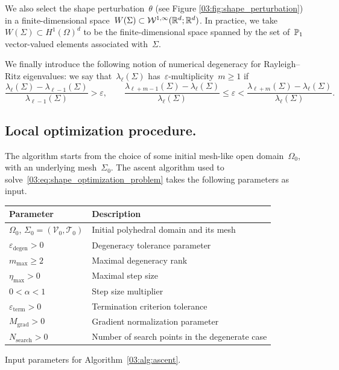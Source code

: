 We also select the shape perturbation~$\theta$ (see Figure \ref{03:fig:shape_perturbation}) in a finite-dimensional space~$W(\Sigma)\subset \Winf(\R^d;\R^d)$. In practice, we take~$W(\Sigma) \subset H^1(\Omega)^d$ to be the finite-dimensional space spanned by the set of~$\P_1$ vector-valued elements associated with~$\Sigma$.

We finally introduce the following notion of numerical degeneracy for Rayleigh--Ritz eigenvalues:
we say that~$\lambda_\ell(\Sigma)$ has~$\varepsilon$-multiplicity~$m \geq 1$ if
    \begin{equation}
        \label{03:eq:degeneracy}
        \frac{\lambda_{\ell}(\Sigma)-\lambda_{\ell-1}(\Sigma)}{\lambda_{\ell-1}(\Sigma)} > \varepsilon,\qquad \frac{\lambda_{\ell+m-1}(\Sigma)-\lambda_\ell(\Sigma)}{\lambda_\ell(\Sigma)} \leq \varepsilon < \frac{\lambda_{\ell+m}(\Sigma)-\lambda_\ell(\Sigma)}{\lambda_\ell(\Sigma)}.
    \end{equation}

\subsection{Local optimization procedure.}
\label{03:subsec:local_opt}
The algorithm starts from the choice of some initial mesh-like open domain~$\Omega_0$, with an underlying mesh~$\Sigma_0$.
The ascent algorithm used to solve~\eqref{03:eq:shape_optimization_problem} takes the following parameters as input.

\noindent
{
\begin{center}
\begin{tabular}{ll}
\toprule
\textbf{Parameter} & \textbf{Description} \\
\midrule
$\Omega_0$, $\Sigma_0 = (\mathcal{V}_0, \mathcal{T}_0)$ & Initial polyhedral domain and its mesh \\
$\varepsilon_{\mathrm{degen}} > 0$ & Degeneracy tolerance parameter \\
$m_{\mathrm{max}} \geq 2$ & Maximal degeneracy rank \\
$\eta_{\mathrm{max}} > 0$ & Maximal step size \\
$0 < \alpha < 1$ & Step size multiplier \\
$\varepsilon_{\mathrm{term}} > 0$ & Termination criterion tolerance \\
$M_{\mathrm{grad}}>0$ & Gradient normalization parameter \\
$N_{\mathrm{search}}>0$ & Number of search points in the degenerate case\\
\bottomrule
\end{tabular}

\noindent
Input parameters for Algorithm~\ref{03:alg:ascent}.
\end{center}
}


